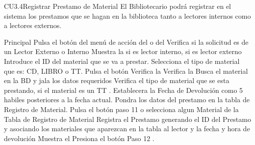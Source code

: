 
	\begin{UseCase}{CU3.4}{Registrar Prestamo de Material}{
		El Bibliotecario podrá registrar en el sistema los prestamos que se hagan en la biblioteca tanto a lectores internos como a lectores externos.
	}
	\end{UseCase}
	\begin{UCtrayectoria}{Principal}
		\UCpaso[\UCactor] Pulsa el botón  del menú de acción del  o del 
		\UCpaso[\UCsist] Verifica si la solicitud es de un Lector Externo o Interno
		\UCpaso[\UCsist] Muestra la  si es lector interno, si es lector externo 
		\UCpaso[\UCactor] Introduce el ID del material que se va a prestar.
		\UCpaso[\UCactor] Selecciona el tipo de material que es: CD, LIBRO o TT.
		\UCpaso[\UCactor] Pulsa el botón 
		\UCpaso[\UCsist] Verifica la  
		\UCpaso[\UCsist] Verifica la  
		\UCpaso[\UCsist] Busca el material en la BD y jala los datos requeridos
		\UCpaso[\UCsist] Verifica el tipo de material que se esta prestando, si el material es un TT .
		\UCpaso[\UCsist] Establecera la Fecha de Devolución como 5 habiles posteriores a la fecha actual.
		\UCpaso[\UCsist] Pondra los datos del prestamo en la tabla de Registro de Material.
		\UCpaso[\UCactor] Pulsa el botón  paso 11  o selecciona algun Material de la Tabla de Registro de Material 
		\UCpaso[\UCsist] Registra el Prestamo generando el ID del Prestamo y asociando los materiales que aparezcan en la tabla al lector y la fecha y hora de devolución
		\UCpaso[\UCsist] Muestra el 
		\UCpaso[\UCactor] Presiona el botón 
		\UCpaso[\UCsist] Paso 12 .
	\end{UCtrayectoria}
